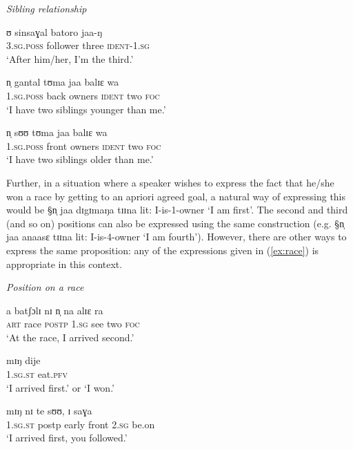 \begin{exe}
\ex\label{ex:sibling}{\it Sibling relationship}
\begin{xlist}

\ex\label{ex:sibling-a}
\gll ʊ sinsaɣal batoro jaa-ŋ \\
      \textsc{3.sg.poss} {follower} {three} \textsc{ident-1.sg}  \\
 \glt  `After him/her, I'm the third.'

\ex\label{ex:sibling-b}
\gll n̩ gantal tʊma jaa balɪɛ wa \\
    \textsc{1.sg.poss} {back} {owners} \textsc{ident}  {two}  \textsc{foc}   \\
\glt   `I have two siblings younger than me.' 


\ex\label{ex:sibling-c}
\gll n̩ sʊʊ tʊma jaa balɪɛ wa \\
   \textsc{1.sg.poss} {front} {owners} \textsc{ident}  {two}  \textsc{foc}   \\
 \glt  `I have two siblings older than me.'
\end{xlist}
\end{exe}



 Further, in a situation where a speaker wishes to
express the fact that he/she won a race by getting to an apriori
agreed  goal, a natural way of expressing this would be  {\S n̩  jaa
   dɪgɪmaŋa tɪɪna} lit: I-is-1-owner `I am first'. The second and third
(and so on) positions can also be expressed using the same construction
(e.g. {\S n̩  jaa anaasɛ tɪɪna} lit: I-is-4-owner `I am fourth').
However,  there are other ways to express the same proposition: any of
the expressions given in (\ref{ex:race}) is appropriate in this
context.

\begin{exe}
\ex\label{ex:race}{\it Position on a race}
\begin{xlist}

\ex\label{ex:}
\gll a batʃɔlɪ nɪ n̩ na alɪɛ  ra\\   
 \textsc{art}  {race} \textsc{postp}   \textsc{1.sg}  {see} {two}   \textsc{foc}
\\
 \glt  `At the race, I arrived second.'

\ex\label{ex:}
\gll mɪŋ dije\\   
    \textsc{1.sg.st} {eat.\textsc{pfv}}  \\
 \glt  `I arrived  first.' or `I won.'

\ex\label{ex:}
\gll mɪŋ nɪ te sʊʊ, ɪ saɣa\\   
    \textsc{1.sg.st} {postp} {early} {front}  \textsc{2.sg} {be.on}\\
 \glt  `I arrived  first, you followed.'
\end{xlist}
\end{exe}

